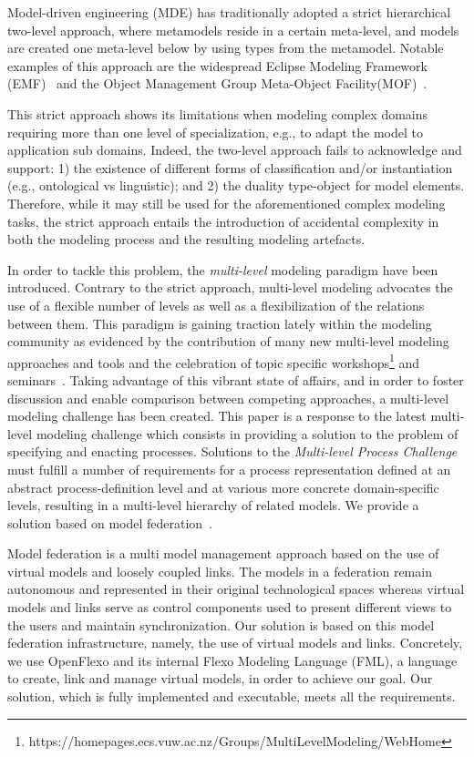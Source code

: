 Model-driven engineering (MDE) has traditionally adopted a strict hierarchical two-level approach, where metamodels reside in a certain meta-level, and models are created one meta-level below by using types from the metamodel. Notable examples of this approach are the widespread Eclipse Modeling Framework (EMF)~\citep{emf} and the Object Management Group Meta-Object Facility(MOF)~\citep{omg2013mof}.

This strict approach shows its limitations when modeling complex domains requiring more than one level of specialization, e.g., to adapt the model to application sub domains. Indeed, the two-level approach fails to acknowledge and support: 1) the existence of different forms of classification and/or instantiation (e.g., ontological vs linguistic); and 2) the duality type-object for model elements. Therefore, while it may still be used for the aforementioned complex modeling tasks, the strict approach entails the introduction of accidental complexity in both the modeling process and the resulting modeling artefacts. 

In order to tackle this problem, the \emph{multi-level} modeling paradigm have been introduced. Contrary to the strict approach, multi-level modeling advocates the use of a flexible number of levels as well as a flexibilization of the relations between them. This paradigm is gaining traction lately within the modeling community as evidenced by the contribution of many new multi-level modeling approaches and tools and the celebration of topic specific workshops\footnote{https://homepages.ecs.vuw.ac.nz/Groups/MultiLevelModeling/WebHome} and seminars~\citep{almeida2018multi}. Taking advantage of this vibrant state of affairs, and in order to foster discussion and enable comparison between competing approaches, a multi-level modeling challenge has been created. This paper is a response to the latest multi-level modeling challenge
which consists in providing a solution to the problem of specifying and enacting processes. Solutions to the \emph{Multi-level Process Challenge} must fulfill a number of requirements for a process representation defined at an abstract process-definition level and at various more concrete domain-specific levels, resulting in a multi-level hierarchy of related models. We provide a solution based on model federation~\citep{Golra2016-federation}.

Model federation is a multi model management approach based on the use of virtual models and loosely coupled links. The models in a federation remain autonomous and represented in their original technological spaces whereas virtual models and links serve as control components used to present different views to the users and maintain synchronization. Our solution is based on this model federation infrastructure, namely, the use of virtual models and links. Concretely, we use OpenFlexo and its internal Flexo Modeling Language (FML), a language to create, link and manage virtual models, in order to achieve our goal. Our solution, which is fully implemented and executable, meets all the requirements.

